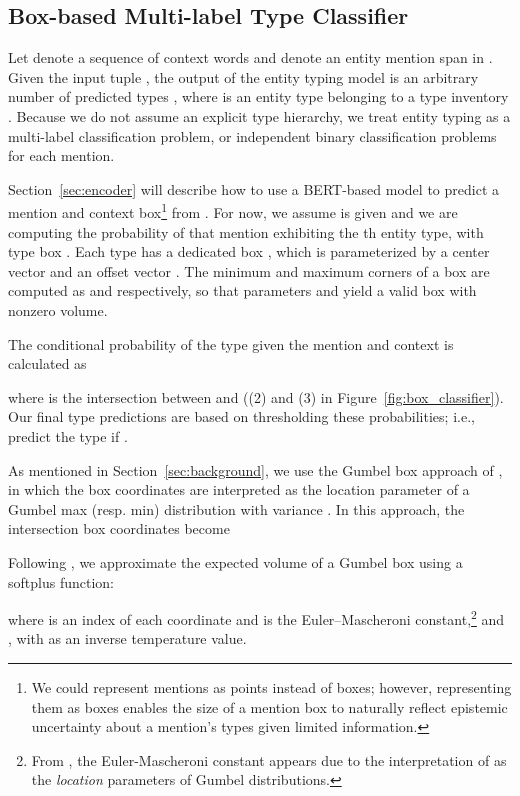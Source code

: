\documentclass[11pt,a4paper]{article}
\begin{document}
\subsection{Box-based Multi-label Type Classifier}
\label{sec:box-based-mltc}

Let  denote a sequence of context words and  denote an entity mention span in . Given the input tuple , the output of the entity typing model is an arbitrary number of predicted types , where  is an entity type belonging to a type inventory . Because we do not assume an explicit type hierarchy, we treat entity typing as a multi-label classification problem, or  independent binary classification problems for each mention. 

Section~\ref{sec:encoder} will describe how to use a BERT-based model to predict a mention and context box\footnote{We could represent mentions as points instead of boxes; however, representing them as boxes enables the size of a mention box to naturally reflect epistemic uncertainty about a mention's types given limited information.}  from . For now, we assume  is given and we are computing the probability of that mention exhibiting the th entity type, with type box . Each type  has a dedicated box , which is parameterized by a center vector  and an offset vector . The minimum and maximum corners of a box  are computed as  and  respectively, so that parameters  and  yield a valid box with nonzero volume.


The conditional probability of the type  given the mention and context  is calculated as

where  is the intersection between  and  ((2) and (3) in Figure~\ref{fig:box_classifier}). Our final type predictions are based on thresholding these probabilities; i.e., predict the type if . 

As mentioned in Section~\ref{sec:background}, we use the Gumbel box approach of \citet{Shib_Sankar_Dasgupta_20}, in which the box coordinates are interpreted as the location parameter of a Gumbel max (resp. min) distribution with variance . In this approach, the intersection box coordinates become

Following \citet{Shib_Sankar_Dasgupta_20}, we approximate the expected volume of a Gumbel box using a softplus function:

where  is an index of each coordinate and   is the Euler–Mascheroni constant,\footnote{From \citet{Shib_Sankar_Dasgupta_20}, the Euler-Mascheroni constant appears due to the interpretation of  as the \textit{location} parameters of Gumbel distributions.} and , with  as an inverse temperature value.
\end{document}
